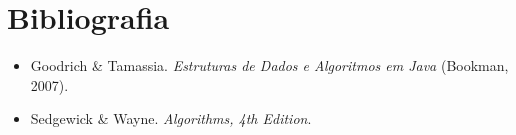 \section*{Bibliografia}

\begin{itemize}
  \item Goodrich \& Tamassia. {\em Estruturas de Dados e Algoritmos em Java} (Bookman, 2007).
  \item Sedgewick \& Wayne. {\em Algorithms, 4th Edition}.
\end{itemize}

